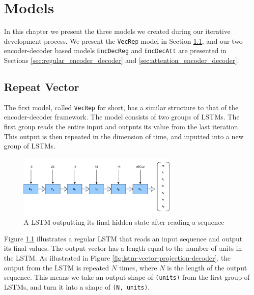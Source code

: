 
\chapter{Models}
\label{ch:models}
In this chapter we present the three models we created during our iterative development process. We present the {\tt VecRep} model in Section \ref{sec:repeat_vector}, and our two encoder-decoder based models {\tt EncDecReg} and {\tt EncDecAtt} are presented in Sections \ref{sec:regular_encoder_decoder} and \ref{sec:attention_encoder_decoder}.


\section{Repeat Vector}
\label{sec:repeat_vector}
The first model, called {\tt VecRep} for short, has a similar structure to that of the encoder-decoder framework. The model consists of two groups of LSTMs. The first group reads the entire input and outputs its value from the last iteration. This output is then repeated in the dimension of time, and inputted into a new group of LSTMs.

\begin{figure}[ht]
    \centering
    \includegraphics[width=0.7\textwidth]{fig/development_process/lstm-vector-projection-encoder.png}
    \caption{A LSTM outputting its final hidden state after reading a sequence}
    \label{fig:lstm-vector-projection-encoder}
\end{figure}

Figure \ref{fig:lstm-vector-projection-encoder} illustrates a regular LSTM that reads an input sequence and output its final values. The output vector has a length equal to the number of units in the LSTM. As illustrated in Figure \ref{fig:lstm-vector-projection-decoder}, the output from the LSTM is repeated \(N\) times, where \(N\) is the length of the output sequence. This means we take an output shape of {\tt (units)} from the first group of LSTMs, and turn it into a shape of {\tt (N, units)}.


